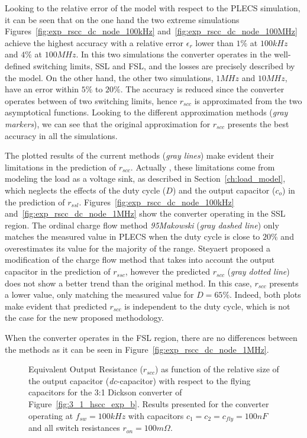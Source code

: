 Looking to the relative error  of the model with respect to the PLECS simulation, it can be seen that on the one hand the two extreme simulations Figures~\ref{fig:exp_rscc_dc_node_100kHz} and~\ref{fig:exp_rscc_dc_node_100MHz} achieve the highest accuracy with a relative error $\epsilon_r$ lower than $1\%$ at $100kHz$ and $4\%$ at $100MHz$. In this two simulations the converter operates in the well-defined switching limits, SSL and FSL, and the losses are precisely described by the model.  On the other hand, the other two simulations, $1MHz$ and $10MHz$,  have an error within $5\%$ to $20\%$. The accuracy is reduced since the converter operates between of two switching limits, hence $r_{scc}$ is approximated from the two asymptotical functions. Looking to the different approximation methods (\emph{gray markers}), we can see that the original approximation for $r_{scc}$ presents the best accuracy in all the simulations.

The plotted results of the current methods (\emph{gray lines}) make evident their  limitations in the prediction of $r_{scc}$. Actually , these limitations come from modeling the load as a voltage sink, as described in Section~\ref{ch:load_model}, which neglects the effects of the duty cycle ($D$) and the output capacitor ($c_o$) in the prediction of $r_{ssl}$. Figures~\ref{fig:exp_rscc_dc_node_100kHz} and~\ref{fig:exp_rscc_dc_node_1MHz} show the converter operating in the SSL region. The ordinal charge flow  method \emph{95Makowski} (\emph{gray dashed line}) only matches the measured value in PLECS when the duty cycle is close to $20\%$ and overestimates its value for the majority of the range. Steyaert proposed a modification of the charge flow method that takes into account the output capacitor in the prediction of $r_{ssc}$, however the predicted $r_{scc}$ (\emph{gray dotted line}) does not show a better trend than the original method. In this case, $r_{scc}$ presents a lower value, only matching the measured value for $D=65\%$.
Indeed, both plots make evident that predicted $r_{scc}$ is independent to the duty cycle, which is not the case for the new proposed methodology.

When the converter operates in the FSL region, there are no differences between the methods as it can be seen in Figure~\ref{fig:exp_rscc_dc_node_1MHz}.

\begin{figure}[!h]
\newcommand\pHeigh{5cm}
\newcommand\pWidth{7cm}
\centering
     
     \caption{Equivalent Output Resistance ($r_{scc}$) as function of the relative size of the output capacitor (\emph{dc}-capacitor) with respect to the flying capacitors for the 3:1 Dickson converter of Figure~\ref{fig:3_1_hscc_exp_b}. Results presented for the converter operating at $f_{sw}=100kHz$ with capacitors $c_1=c_2=c_{fly}=100nF$ and all switch resistances $r_{on} = 100m\Omega$.}\label{fig:exp_rscc_pwm_node_fsw}
\end{figure}

